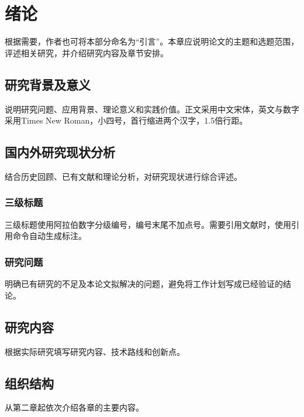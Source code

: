\chapter{绪论}
根据需要，作者也可将本部分命名为“引言”。本章应说明论文的主题和选题范围，评述相关研究，并介绍研究内容及章节安排。
\section{研究背景及意义}
说明研究问题、应用背景、理论意义和实践价值。正文采用中文宋体，英文与数字采用Times New Roman，小四号，首行缩进两个汉字，1.5倍行距。
\section{国内外研究现状分析}
结合历史回顾、已有文献和理论分析，对研究现状进行综合评述。
\subsection{三级标题}
三级标题使用阿拉伯数字分级编号，编号末尾不加点号。需要引用文献时，使用引用命令自动生成标注。
\subsection{研究问题}
明确已有研究的不足及本论文拟解决的问题，避免将工作计划写成已经验证的结论。
\section{研究内容}
根据实际研究填写研究内容、技术路线和创新点。
\section{组织结构}
从第二章起依次介绍各章的主要内容。

